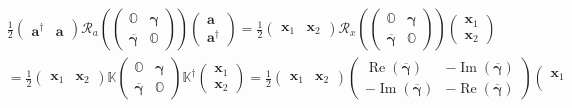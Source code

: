 \documentclass[aps, preprint]{revtex4}
\begin{document}
\begin{align} & \frac{1}{2} \left (\begin{array}{cc}\mathbf{a}^{ \dag } & \mathbf{a}\end{array}\right ) \mathcal{R}_{a} \left (\left (\begin{array}{cc}\mathbb{O} & \mathbf{\gamma } \\
\overline{\mathbf{\gamma }} & \mathbb{O}\end{array}\right )\right ) \left (\begin{array}{c}\mathbf{a} \\
\mathbf{a}^{ \dag }\end{array}\right ) =\frac{1}{2} \left (\begin{array}{cc}\mathbf{x}_{1} & \mathbf{x}_{2}\end{array}\right ) \mathcal{R}_{x} \left (\left (\begin{array}{cc}\mathbb{O} & \mathbf{\gamma } \\
\overline{\mathbf{\gamma }} & \mathbb{O}\end{array}\right )\right ) \left (\begin{array}{c}\mathbf{x}_{1} \\
\mathbf{x}_{2}\end{array}\right ) \\
 &  =\frac{1}{2} \left (\begin{array}{cc}\mathbf{x}_{1} & \mathbf{x}_{2}\end{array}\right ) \mathbb{K} \left (\begin{array}{cc}\mathbb{O} & \mathbf{\gamma } \\
\overline{\mathbf{\gamma }} & \mathbb{O}\end{array}\right ) \mathbb{K}^{ \dag } \left (\begin{array}{c}\mathbf{x}_{1} \\
\mathbf{x}_{2}\end{array}\right ) =\frac{1}{2} \left (\begin{array}{cc}\mathbf{x}_{1} & \mathbf{x}_{2}\end{array}\right ) \left (\begin{array}{cc}\ensuremath{\operatorname*{Re}} \left (\overline{\mathbf{\gamma }}\right ) &  -\ensuremath{\operatorname*{Im}} \left (\overline{\mathbf{\gamma }}\right ) \\
 -\ensuremath{\operatorname*{Im}} \left (\overline{\mathbf{\gamma }}\right ) &  -\ensuremath{\operatorname*{Re}} \left (\overline{\mathbf{\gamma }}\right )\end{array}\right ) \left (\begin{array}{c}\mathbf{x}_{1} \\

\end{array}
\end{align}
\end{document}
